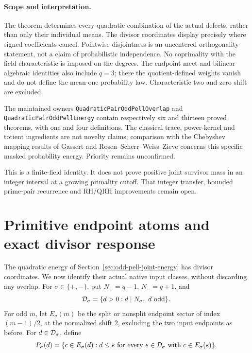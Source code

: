 \documentclass[11pt]{article}
\begin{document}
\paragraph{Scope and interpretation.}
The theorem determines every quadratic combination of the actual
defects, rather than only their individual means.
The divisor coordinates display precisely where signed coefficients
cancel. Pointwise disjointness is an uncentered orthogonality statement,
not a claim of probabilistic independence.
No coprimality with the field characteristic is imposed on the degrees.
The endpoint meet and bilinear algebraic identities also include \(q=3\);
there the quotient-defined weights vanish and do not define the
mean-one probability law. Characteristic two and zero shift are excluded.

The maintained owners \texttt{QuadraticPairOddPellOverlap} and
\texttt{QuadraticPairOddPellEnergy} contain respectively six and
thirteen proved theorems, with one and four definitions.
The classical trace, power-kernel and totient ingredients are not
novelty claims; comparison with the Chebyshev mapping results of
Gassert and Rosen--Scherr--Weiss--Zieve concerns this specific
masked probability energy. Priority remains unconfirmed.

This is a finite-field identity. It does not prove positive joint
survivor mass in an integer interval at a growing primality cutoff.
That integer transfer, bounded prime-pair recurrence and RH/QRH
improvements remain open.

\section{Primitive endpoint atoms and exact divisor response}
\label{sec:odd-pell-primitive-atoms}

The quadratic energy of Section~\ref{sec:odd-pell-joint-energy}
has divisor coordinates. We now identify their actual native input
classes, without discarding any overlap.
For \(\sigma\in\{+,-\}\), put \(N_+=q-1\), \(N_-=q+1\), and
\[
 {\cal D}_\sigma=\{d>0:d\mid N_\sigma,\ d\text{ odd}\}.
\]
For odd \(m\), let \(E_\sigma(m)\) be the split or nonsplit
endpoint sector of index \((m-1)/2\), at the normalized shift \(2\),
excluding the two input endpoints as before. For \(d\in{\cal D}_\sigma\), define
\[
 P_\sigma(d)=\{c\in E_\sigma(d):
     d\le e\text{ for every }e\in{\cal D}_\sigma
                    \text{ with }c\in E_\sigma(e)\}.
\]
\end{document}
